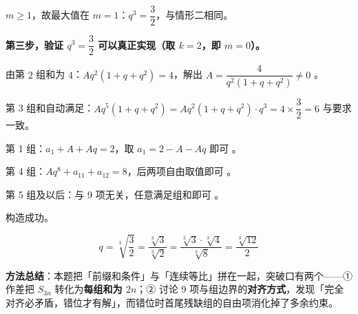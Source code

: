 \begin{answer}
$m\ge1$，故最大值在 $m=1$：$q^3=\dfrac32$，与情形二相同。

\par\medskip

\textbf{第三步，验证 $q^3=\dfrac32$ 可以真正实现（取 $k=2$，即 $m=0$）。}

由第 $2$ 组和为 $4$：$Aq^2\left(1+q+q^2\right)=4$，解出 $A=\dfrac{4}{q^2\left(1+q+q^2\right)}\ne0$ 。

第 3 组和自动满足：$Aq^5(1+q+q^2)=Aq^2(1+q+q^2)\cdot q^3=4\times\dfrac32=6$  与要求一致。

第 1 组：$a_1+A+Aq=2$，取 $a_1=2-A-Aq$ 即可 。

第 4 组：$Aq^8+a_{11}+a_{12}=8$，后两项自由取值即可 。

第 5 组及以后：与 9 项无关，任意满足组和即可 。

构造成功。


\nopagebreak[4]
\[q=\sqrt[3]{\frac32}=\frac{\sqrt[3]{3}}{\sqrt[3]{2}}=\frac{\sqrt[3]{3}\cdot\sqrt[3]{4}}{\sqrt[3]{8}}=\frac{\sqrt[3]{12}}{2}\]

\begin{gktip}
\textbf{方法总结}：本题把「前缀和条件」与「连续等比」拼在一起，突破口有两个——① 作差把 $S_{3n}$ 转化为\textbf{每组和为 $2n$}；② 讨论 9 项与组边界的\textbf{对齐方式}，发现「完全对齐必矛盾，错位才有解」，而错位时首尾残缺组的自由项消化掉了多余约束。
\end{gktip}


\par\medskip

\end{answer}

